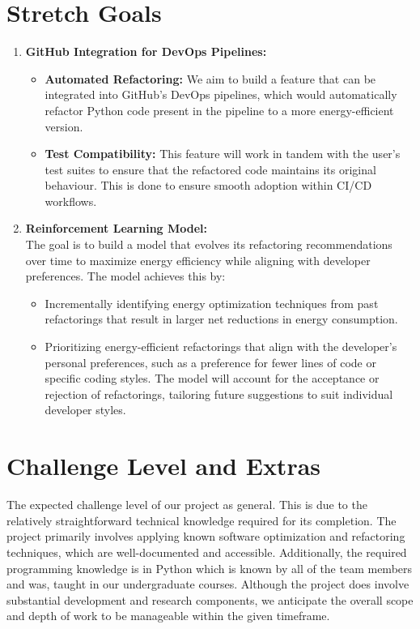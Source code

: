 \documentclass{article}
\begin{document}
\section{Stretch Goals}

\begin{enumerate}
  \item \textbf{GitHub Integration for DevOps Pipelines:}
    \begin{itemize}
      \item \textbf{Automated Refactoring:} We aim to build a feature
        that can be integrated into GitHub’s DevOps pipelines, which
        would automatically refactor Python code present in the
        pipeline to a more energy-efficient version.
      \item \textbf{Test Compatibility:} This feature will work in
        tandem with the user's test suites to ensure that the
        refactored code maintains its original behaviour. This is
        done to ensure smooth adoption within CI/CD workflows.
    \end{itemize}

  \item \textbf{Reinforcement Learning Model:} \\
    The goal is to build a model that evolves its refactoring
    recommendations over time to maximize energy efficiency while
    aligning with developer preferences. The model achieves this by:
    \begin{itemize}
      \item Incrementally identifying energy optimization techniques
        from past refactorings that result in larger net reductions
        in energy consumption.
      \item Prioritizing energy-efficient refactorings that align
        with the developer's personal preferences, such as a
        preference for fewer lines of code or specific coding styles.
        The model will account for the acceptance or rejection of
        refactorings, tailoring future suggestions to suit individual
        developer styles.
    \end{itemize}
\end{enumerate}

\section{Challenge Level and Extras}

The expected challenge level of our project as general. This is due to the
relatively straightforward technical knowledge required for its completion.
The project primarily involves applying known software optimization and
refactoring techniques, which are well-documented and accessible.
Additionally, the required programming knowledge is in Python which is known
by all of the team members and was, taught in our undergraduate courses.
Although the project does involve substantial development and
research components,
we anticipate the overall scope and depth of work to be manageable within the
given timeframe. \\
\end{document}
